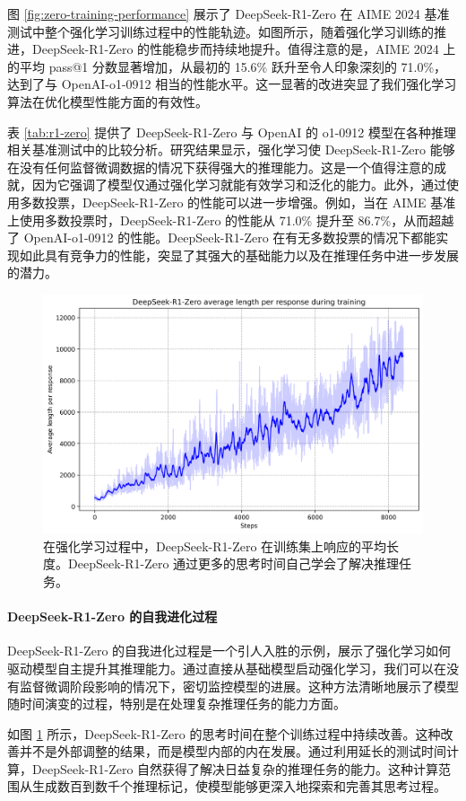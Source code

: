 \documentclass[lang=cn,a4paper,newtx]{elegantpaper}
\newcommand{\dsro}{DeepSeek-R1-Zero}
\begin{document}
图 \ref{fig:zero-training-performance} 展示了 \dsro{} 在 AIME 2024 基准测试中整个强化学习训练过程中的性能轨迹。如图所示，随着强化学习训练的推进，\dsro{} 的性能稳步而持续地提升。值得注意的是，AIME 2024 上的平均 pass@1 分数显著增加，从最初的 15.6\% 跃升至令人印象深刻的 71.0\%，达到了与 OpenAI-o1-0912 相当的性能水平。这一显著的改进突显了我们强化学习算法在优化模型性能方面的有效性。

表 \ref{tab:r1-zero} 提供了 \dsro{} 与 OpenAI 的 o1-0912 模型在各种推理相关基准测试中的比较分析。研究结果显示，强化学习使 \dsro{} 能够在没有任何监督微调数据的情况下获得强大的推理能力。这是一个值得注意的成就，因为它强调了模型仅通过强化学习就能有效学习和泛化的能力。此外，通过使用多数投票，\dsro{} 的性能可以进一步增强。例如，当在 AIME 基准上使用多数投票时，\dsro{} 的性能从 71.0\% 提升至 86.7\%，从而超越了 OpenAI-o1-0912 的性能。\dsro{} 在有无多数投票的情况下都能实现如此具有竞争力的性能，突显了其强大的基础能力以及在推理任务中进一步发展的潜力。

\begin{figure}[t]
  \centering
  \includegraphics[width=0.75\linewidth]{figures/plot_length.png}
  \caption{在强化学习过程中，\dsro{} 在训练集上响应的平均长度。\dsro{} 通过更多的思考时间自己学会了解决推理任务。}
  \label{fig:zero-training-length}
\end{figure}

\paragraph{\dsro{} 的自我进化过程}

\dsro{} 的自我进化过程是一个引人入胜的示例，展示了强化学习如何驱动模型自主提升其推理能力。通过直接从基础模型启动强化学习，我们可以在没有监督微调阶段影响的情况下，密切监控模型的进展。这种方法清晰地展示了模型随时间演变的过程，特别是在处理复杂推理任务的能力方面。

如图 \ref{fig:zero-training-length} 所示，\dsro{} 的思考时间在整个训练过程中持续改善。这种改善并不是外部调整的结果，而是模型内部的内在发展。通过利用延长的测试时间计算，\dsro{} 自然获得了解决日益复杂的推理任务的能力。这种计算范围从生成数百到数千个推理标记，使模型能够更深入地探索和完善其思考过程。
\end{document}
